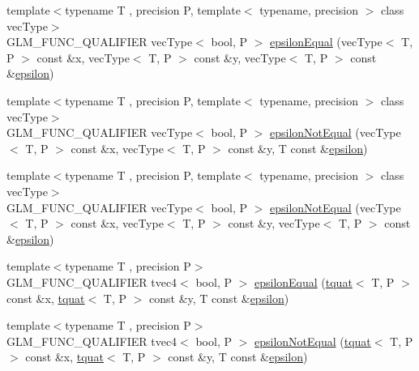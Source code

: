 \begin{DoxyCompactItemize}
\item 
{\footnotesize template$<$typename T , precision P, template$<$ typename, precision $>$ class vec\+Type$>$ }\\G\+L\+M\+\_\+\+F\+U\+N\+C\+\_\+\+Q\+U\+A\+L\+I\+F\+I\+E\+R vec\+Type$<$ bool, P $>$ \hyperlink{namespaceglm_abc7f87cb473f9c9d7d6109e96c139807}{epsilon\+Equal} (vec\+Type$<$ T, P $>$ const \&x, vec\+Type$<$ T, P $>$ const \&y, vec\+Type$<$ T, P $>$ const \&\hyperlink{group__gtc__constants_ga2a1e57fc5592b69cfae84174cbfc9429}{epsilon})
\item 
{\footnotesize template$<$typename T , precision P, template$<$ typename, precision $>$ class vec\+Type$>$ }\\G\+L\+M\+\_\+\+F\+U\+N\+C\+\_\+\+Q\+U\+A\+L\+I\+F\+I\+E\+R vec\+Type$<$ bool, P $>$ \hyperlink{namespaceglm_a76da74051c42eebf3256cd31464fa043}{epsilon\+Not\+Equal} (vec\+Type$<$ T, P $>$ const \&x, vec\+Type$<$ T, P $>$ const \&y, T const \&\hyperlink{group__gtc__constants_ga2a1e57fc5592b69cfae84174cbfc9429}{epsilon})
\item 
{\footnotesize template$<$typename T , precision P, template$<$ typename, precision $>$ class vec\+Type$>$ }\\G\+L\+M\+\_\+\+F\+U\+N\+C\+\_\+\+Q\+U\+A\+L\+I\+F\+I\+E\+R vec\+Type$<$ bool, P $>$ \hyperlink{namespaceglm_a34387d61360bf88bcca96b797f53e49d}{epsilon\+Not\+Equal} (vec\+Type$<$ T, P $>$ const \&x, vec\+Type$<$ T, P $>$ const \&y, vec\+Type$<$ T, P $>$ const \&\hyperlink{group__gtc__constants_ga2a1e57fc5592b69cfae84174cbfc9429}{epsilon})
\item 
{\footnotesize template$<$typename T , precision P$>$ }\\G\+L\+M\+\_\+\+F\+U\+N\+C\+\_\+\+Q\+U\+A\+L\+I\+F\+I\+E\+R tvec4$<$ bool, P $>$ \hyperlink{namespaceglm_a9573ceefb3bf8f199bd920f2a7ffa4cb}{epsilon\+Equal} (\hyperlink{structglm_1_1tquat}{tquat}$<$ T, P $>$ const \&x, \hyperlink{structglm_1_1tquat}{tquat}$<$ T, P $>$ const \&y, T const \&\hyperlink{group__gtc__constants_ga2a1e57fc5592b69cfae84174cbfc9429}{epsilon})
\item 
{\footnotesize template$<$typename T , precision P$>$ }\\G\+L\+M\+\_\+\+F\+U\+N\+C\+\_\+\+Q\+U\+A\+L\+I\+F\+I\+E\+R tvec4$<$ bool, P $>$ \hyperlink{namespaceglm_a1fcc8ab0db03be6e6c6c375b170c1f79}{epsilon\+Not\+Equal} (\hyperlink{structglm_1_1tquat}{tquat}$<$ T, P $>$ const \&x, \hyperlink{structglm_1_1tquat}{tquat}$<$ T, P $>$ const \&y, T const \&\hyperlink{group__gtc__constants_ga2a1e57fc5592b69cfae84174cbfc9429}{epsilon})

\end{DoxyCompactItemize}
